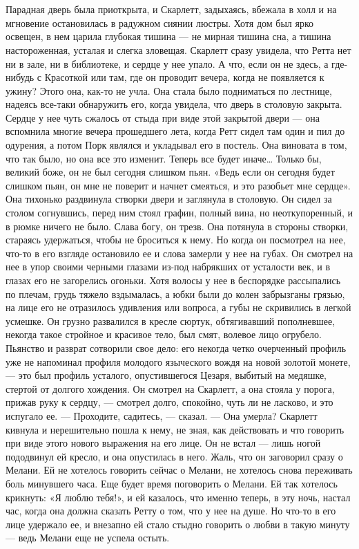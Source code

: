 \chapter{\ }

Парадная дверь была приоткрыта, и Скарлетт, задыхаясь, вбежала в холл и на мгновение остановилась в радужном сиянии люстры. Хотя дом был ярко освещен, в нем царила глубокая тишина — не мирная тишина сна, а тишина настороженная, усталая и слегка зловещая. Скарлетт сразу увидела, что Ретта нет ни в зале, ни в библиотеке, и сердце у нее упало. А что, если он не здесь, а где-нибудь с Красоткой или там, где он проводит вечера, когда не появляется к ужину? Этого она, как-то не учла.
Она стала было подниматься по лестнице, надеясь все-таки обнаружить его, когда увидела, что дверь в столовую закрыта. Сердце у нее чуть сжалось от стыда при виде этой закрытой двери — она вспомнила многие вечера прошедшего лета, когда Ретт сидел там один и пил до одурения, а потом Порк являлся и укладывал его в постель. Она виновата в том, что так было, но она все это изменит. Теперь все будет иначе… Только бы, великий боже, он не был сегодня слишком пьян. «Ведь если он сегодня будет слишком пьян, он мне не поверит и начнет смеяться, и это разобьет мне сердце».
Она тихонько раздвинула створки двери и заглянула в столовую. Он сидел за столом согнувшись, перед ним стоял графин, полный вина, но неоткупоренный, и в рюмке ничего не было. Слава богу, он трезв. Она потянула в стороны створки, стараясь удержаться, чтобы не броситься к нему. Но когда он посмотрел на нее, что-то в его взгляде остановило ее и слова замерли у нее на губах.
Он смотрел на нее в упор своими черными глазами из-под набрякших от усталости век, и в глазах его не загорелись огоньки. Хотя волосы у нее в беспорядке рассыпались по плечам, грудь тяжело вздымалась, а юбки были до колен забрызганы грязью, на лице его не отразилось удивления или вопроса, а губы не скривились в легкой усмешке. Он грузно развалился в кресле сюртук, обтягивавший пополневшее, некогда такое стройное и красивое тело, был смят, волевое лицо огрубело. Пьянство и разврат сотворили свое дело: его некогда четко очерченный профиль уже не напоминал профиля молодого языческого вождя на новой золотой монете, — это был профиль усталого, опустившегося Цезаря, выбитый на медяшке, стертой от долгого хождения. Он смотрел на Скарлетт, а она стояла у порога, прижав руку к сердцу, — смотрел долго, спокойно, чуть ли не ласково, и это испугало ее.
— Проходите, садитесь, — сказал. — Она умерла? Скарлетт кивнула и нерешительно пошла к нему, не зная, как действовать и что говорить при виде этого нового выражения на его лице. Он не встал — лишь ногой пододвинул ей кресло, и она опустилась в него. Жаль, что он заговорил сразу о Мелани. Ей не хотелось говорить сейчас о Мелани, не хотелось снова переживать боль минувшего часа. Еще будет время поговорить о Мелани. Ей так хотелось крикнуть: «Я люблю тебя!», и ей казалось, что именно теперь, в эту ночь, настал час, когда она должна сказать Ретту о том, что у нее на душе. Но что-то в его лице удержало ее, и внезапно ей стало стыдно говорить о любви в такую минуту — ведь Мелани еще не успела остыть.
